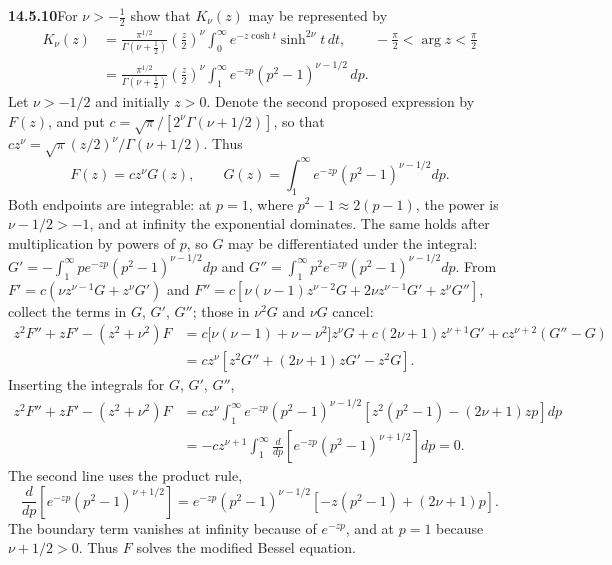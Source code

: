 \par\bigskip
\noindent\textbf{14.5.10}\quad For $\nu>-\frac{1}{2}$ show that
$K_{\nu}(z)$ may be represented by
\begin{align*}
K_{\nu}(z)&=\frac{\pi^{1/2}}{\Gamma(\nu+\frac{1}{2})}
\left(\frac{z}{2}\right)^{\nu}
\int_{0}^{\infty}e^{-z\cosh t}\sinh^{2\nu}t\,dt,
\qquad-\frac{\pi}{2}<\arg z<\frac{\pi}{2}\\[2pt]
&=\frac{\pi^{1/2}}{\Gamma(\nu+\frac{1}{2})}
\left(\frac{z}{2}\right)^{\nu}
\int_{1}^{\infty}e^{-zp}(p^{2}-1)^{\nu-1/2}\,dp.
\end{align*}
\solution
Let $\nu>-1/2$ and initially $z>0$. Denote the second proposed
expression by $F(z)$, and put
$c=\sqrt\pi/[2^\nu\Gamma(\nu+1/2)]$, so that
$cz^\nu=\sqrt\pi(z/2)^\nu/\Gamma(\nu+1/2)$. Thus
\[
F(z)=c z^\nu G(z),\qquad
G(z)=\int_1^\infty e^{-zp}(p^2-1)^{\nu-1/2}dp.
\]
Both endpoints are integrable: at $p=1$, where
$p^2-1\approx2(p-1)$, the power is $\nu-1/2>-1$, and at infinity
the exponential dominates. The same holds after multiplication by
powers of $p$, so $G$ may be differentiated under the integral:
$G'=-\int_1^\infty pe^{-zp}(p^2-1)^{\nu-1/2}dp$ and
$G''=\int_1^\infty p^2e^{-zp}(p^2-1)^{\nu-1/2}dp$. From
$F'=c(\nu z^{\nu-1}G+z^\nu G')$ and
$F''=c[\nu(\nu-1)z^{\nu-2}G+2\nu z^{\nu-1}G'+z^\nu G'']$, collect
the terms in $G$, $G'$, $G''$; those in $\nu^2G$ and $\nu G$
cancel:
\begin{align*}
z^2F''+zF'-(z^2+\nu^2)F
&=c\bigl[\nu(\nu-1)+\nu-\nu^2\bigr]z^\nu G
+c(2\nu+1)z^{\nu+1}G'+cz^{\nu+2}(G''-G)\\
&=cz^\nu[z^2G''+(2\nu+1)zG'-z^2G].
\end{align*}
Inserting the integrals for $G$, $G'$, $G''$,
\begin{align*}
z^2F''+zF'-(z^2+\nu^2)F
&=cz^\nu\int_1^\infty e^{-zp}(p^2-1)^{\nu-1/2}
[z^2(p^2-1)-(2\nu+1)zp]dp\\
&=-cz^{\nu+1}\int_1^\infty\frac d{dp}
[e^{-zp}(p^2-1)^{\nu+1/2}]dp=0.
\end{align*}
The second line uses the product rule,
\[
\frac d{dp}[e^{-zp}(p^2-1)^{\nu+1/2}]
=e^{-zp}(p^2-1)^{\nu-1/2}[-z(p^2-1)+(2\nu+1)p].
\]
The boundary term vanishes at infinity because of $e^{-zp}$, and
at $p=1$ because $\nu+1/2>0$.
Thus $F$ solves the modified Bessel equation.

